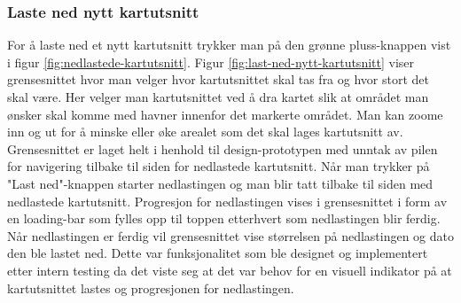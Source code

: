 \subsubsection{Laste ned nytt kartutsnitt}
For å laste ned et nytt kartutsnitt trykker man på den grønne pluss-knappen vist i figur \ref{fig:nedlastede-kartutsnitt}. Figur \ref{fig:last-ned-nytt-kartutsnitt} viser grensesnittet hvor man velger hvor kartutsnittet skal tas fra og hvor stort det skal være. Her velger man kartutsnittet ved å dra kartet slik at området man ønsker skal komme med havner innenfor det markerte området. Man kan zoome inn og ut for å minske eller øke arealet som det skal lages kartutsnitt av. Grensesnittet er laget helt i henhold til design-prototypen med unntak av pilen for navigering tilbake til siden for nedlastede kartutsnitt. Når man trykker på "Last ned"-knappen starter nedlastingen og man blir tatt tilbake til siden med nedlastede kartutsnitt. Progresjon for nedlastingen vises i grensesnittet i form av en loading-bar som fylles opp til toppen etterhvert som nedlastingen blir ferdig. Når nedlastingen er ferdig vil grensesnittet vise størrelsen på nedlastingen og dato den ble lastet ned. Dette var funksjonalitet som ble designet og implementert etter intern testing da det viste seg at det var behov for en visuell indikator på at kartutsnittet lastes og progresjonen for nedlastingen.
